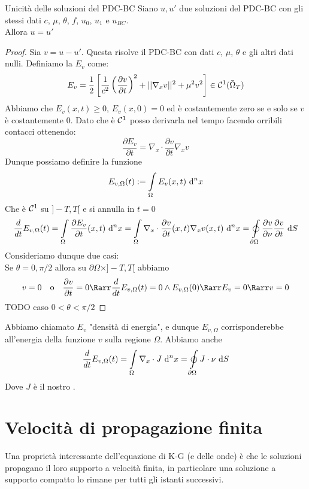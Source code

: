 \documentclass{book}
\begin{document}
\begin{theorem}{Unicità delle soluzioni del PDC-BC}{}
    Siano $u,u'$ due soluzioni del PDC-BC con gli stessi dati $c$, $\mu$, $\theta$, $f$, $u_0$, $u_1$ e $u_{BC}$.\\
    Allora $u=u'$
\end{theorem}
\begin{proof}
    Sia $v = u-u'$. Questa risolve il PDC-BC con dati $c$, $\mu$, $\theta$ e gli altri dati nulli. Definiamo la  $E_v$ come:
    \[E_v = \frac{1}{2}\left[ \frac{1}{c^2}\left(\frac{\partial v}{\partial t}\right)^2 + ||\nabla_x v||^2 + \mu^2 v^2 \right] \in \mathcal{C}^1(\bar{\Omega}_T)\]
    Abbiamo che $E_v(x,t)\ge 0$, $E_v(x,0) = 0$ ed è costantemente zero se e solo se $v$ è costantemente 0. Dato che è $\mathcal{C}^1$ posso derivarla nel tempo facendo orribili contacci ottenendo:
    \[\frac{\partial E_v}{\partial t} = \nabla_x \cdot \frac{\partial v}{\partial t} \nabla_x v\]
    Dunque possiamo definire la funzione
    \[E_{v,\Omega}(t) := \int\limits_{\Omega} E_v(x,t)\text{ d}^n x\]
    Che è $\mathcal{C}^1$ su $]-T,T[$ e si annulla in $t=0$
    \[\frac{d}{d t}E_{v,\Omega}(t) = \int\limits_{\Omega} \frac{\partial E_v}{\partial t}(x,t)\text{ d}^n x = \int\limits_{\Omega}\nabla_x \cdot \frac{\partial v}{\partial t}(x,t) \nabla_x v(x,t)\text{ d}^n x = \oint\limits_{\partial\Omega}\frac{\partial v}{\partial \nu} \frac{\partial v}{\partial t}\text{ d} S\]
    Consideriamo dunque due casi:\\
    Se $\theta = 0, \pi/2$ allora su $\partial\Omega \times ]-T,T[$ abbiamo
    \[v = 0 \quad \text{o} \quad \frac{\partial v}{\partial t} = 0\Rarr \frac{d}{d t}E_{v,\Omega}(t) =0 \wedge E_{v,\Omega}(0) \Rarr E_v = 0 \Rarr v = 0\]
    TODO caso $0<\theta < \pi/2$
\end{proof}
\begin{remark}{}{}
    Abbiamo chiamato $E_v$ "densità di energia", e dunque $E_{v,\Omega}$ corrisponderebbe all'energia della funzione $v$ sulla regione $\Omega$. Abbiamo anche
    \[\frac{d}{d t}E_{v,\Omega}(t) = \int\limits_{\Omega}\nabla_x \cdot J \text{ d}^n x = \oint\limits_{\partial \Omega}J \cdot \nu \text{ d} S\]
    Dove $J$ è il nostro . 
\end{remark}

\section{Velocità di propagazione finita}

Una proprietà interessante dell'equazione di K-G (e delle onde) è che le soluzioni propagano il loro supporto a velocità finita, in particolare una soluzione a supporto compatto lo rimane per tutti gli istanti successivi.
\end{document}
